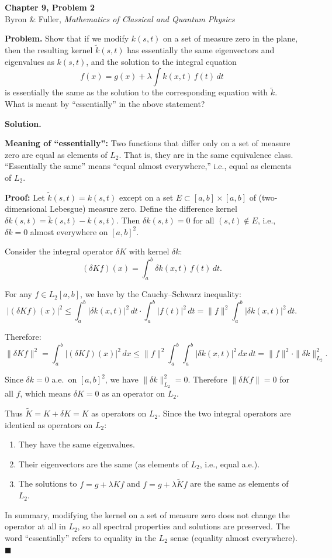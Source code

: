 \documentclass[12pt]{article}
\begin{document}
\begin{center}
{\Large\bfseries Chapter 9, Problem 2}\\[6pt]
Byron \& Fuller, \textit{Mathematics of Classical and Quantum Physics}
\end{center}

\bigskip

\textbf{Problem.} Show that if we modify $k(s,t)$ on a set of measure zero in the plane, then the resulting kernel $\tilde{k}(s,t)$ has essentially the same eigenvectors and eigenvalues as $k(s,t)$, and the solution to the integral equation
\[
f(x) = g(x) + \lambda \int k(x,t)\,f(t)\,dt
\]
is essentially the same as the solution to the corresponding equation with $\tilde{k}$. What is meant by ``essentially'' in the above statement?

\bigskip
\textbf{Solution.}

\textbf{Meaning of ``essentially'':} Two functions that differ only on a set of measure zero are equal as elements of $L_2$. That is, they are in the same equivalence class. ``Essentially the same'' means ``equal almost everywhere,'' i.e., equal as elements of $L_2$.

\textbf{Proof:} Let $\tilde{k}(s,t) = k(s,t)$ except on a set $E \subset [a,b] \times [a,b]$ of (two-dimensional Lebesgue) measure zero. Define the difference kernel $\delta k(s,t) = \tilde{k}(s,t) - k(s,t)$. Then $\delta k(s,t) = 0$ for all $(s,t) \notin E$, i.e., $\delta k = 0$ almost everywhere on $[a,b]^2$.

Consider the integral operator $\delta K$ with kernel $\delta k$:
\[
(\delta K f)(x) = \int_a^b \delta k(x,t)\,f(t)\,dt.
\]

For any $f \in L_2[a,b]$, we have by the Cauchy--Schwarz inequality:
\[
|(\delta K f)(x)|^2 \le \int_a^b |\delta k(x,t)|^2\,dt \cdot \int_a^b |f(t)|^2\,dt = \|f\|^2 \int_a^b |\delta k(x,t)|^2\,dt.
\]

Therefore:
\[
\|\delta K f\|^2 = \int_a^b |(\delta K f)(x)|^2\,dx \le \|f\|^2 \int_a^b \int_a^b |\delta k(x,t)|^2\,dx\,dt = \|f\|^2 \cdot \|\delta k\|_{L_2}^2.
\]

Since $\delta k = 0$ a.e.\ on $[a,b]^2$, we have $\|\delta k\|_{L_2}^2 = 0$. Therefore $\|\delta K f\| = 0$ for all $f$, which means $\delta K = 0$ as an operator on $L_2$.

Thus $\tilde{K} = K + \delta K = K$ as operators on $L_2$. Since the two integral operators are identical as operators on $L_2$:

\begin{enumerate}
\item They have the same eigenvalues.
\item Their eigenvectors are the same (as elements of $L_2$, i.e., equal a.e.).
\item The solutions to $f = g + \lambda K f$ and $f = g + \lambda \tilde{K} f$ are the same as elements of $L_2$.
\end{enumerate}

In summary, modifying the kernel on a set of measure zero does not change the operator at all in $L_2$, so all spectral properties and solutions are preserved. The word ``essentially'' refers to equality in the $L_2$ sense (equality almost everywhere). \hfill $\blacksquare$
\end{document}
